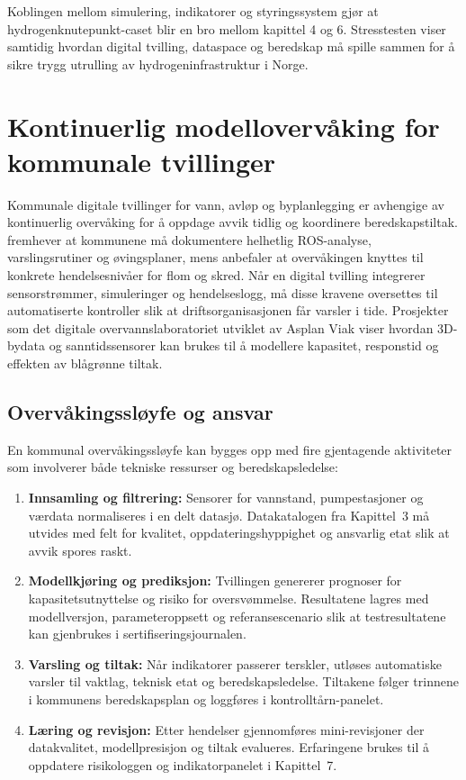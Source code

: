 Koblingen mellom simulering, indikatorer og styringssystem gjør at hydrogenknutepunkt-caset blir en bro mellom kapittel 4 og 6. Stresstesten viser samtidig hvordan digital tvilling, dataspace og beredskap må spille sammen for å sikre trygg utrulling av hydrogeninfrastruktur i Norge.

\section{Kontinuerlig modellovervåking for kommunale tvillinger}
Kommunale digitale tvillinger for vann, avløp og byplanlegging er avhengige av kontinuerlig overvåking for å oppdage avvik tidlig og koordinere beredskapstiltak. \citet{dsb2022beredskap} fremhever at kommunene må dokumentere helhetlig ROS-analyse, varslingsrutiner og øvingsplaner, mens \citet{nve2022kommunal} anbefaler at overvåkingen knyttes til konkrete hendelsesnivåer for flom og skred. Når en digital tvilling integrerer sensorstrømmer, simuleringer og hendelseslogg, må disse kravene oversettes til automatiserte kontroller slik at driftsorganisasjonen får varsler i tide. Prosjekter som det digitale overvannslaboratoriet utviklet av Asplan Viak viser hvordan 3D-bydata og sanntidssensorer kan brukes til å modellere kapasitet, responstid og effekten av blågrønne tiltak.\citep{asplan2023overvannslab}

\subsection{Overvåkingssløyfe og ansvar}
En kommunal overvåkingssløyfe kan bygges opp med fire gjentagende aktiviteter som involverer både tekniske ressurser og beredskapsledelse:
\begin{enumerate}
    \item \textbf{Innsamling og filtrering:} Sensorer for vannstand, pumpestasjoner og værdata normaliseres i en delt datasjø. Datakatalogen fra Kapittel~3 må utvides med felt for kvalitet, oppdateringshyppighet og ansvarlig etat slik at avvik spores raskt.\citep{nve2022kommunal}
    \item \textbf{Modellkjøring og prediksjon:} Tvillingen genererer prognoser for kapasitetsutnyttelse og risiko for oversvømmelse. Resultatene lagres med modellversjon, parameteroppsett og referansescenario slik at testresultatene kan gjenbrukes i sertifiseringsjournalen.
    \item \textbf{Varsling og tiltak:} Når indikatorer passerer terskler, utløses automatiske varsler til vaktlag, teknisk etat og beredskapsledelse. Tiltakene følger trinnene i kommunens beredskapsplan og loggføres i kontrolltårn-panelet.\citep{dsb2022beredskap}
    \item \textbf{Læring og revisjon:} Etter hendelser gjennomføres mini-revisjoner der datakvalitet, modellpresisjon og tiltak evalueres. Erfaringene brukes til å oppdatere risikologgen og indikatorpanelet i Kapittel~7.
\end{enumerate}

